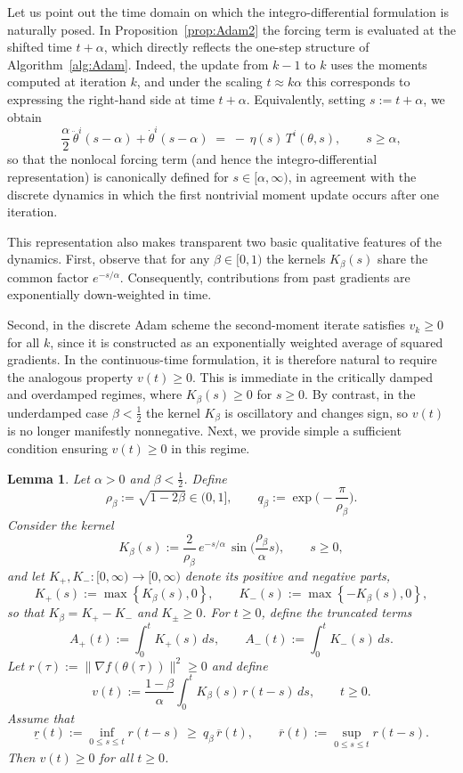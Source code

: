 \documentclass{article} %
\newtheorem{lemma}{Lemma}
\begin{document}
Let us point out the time domain on which the integro-differential formulation is naturally posed. In Proposition~\ref{prop:Adam2} the forcing term is evaluated at the shifted time $t+\alpha$, which directly reflects the one-step structure of Algorithm~\ref{alg:Adam}. Indeed, the update from $k-1$ to $k$ uses the moments computed at iteration $k$, and under the scaling $t\approx k\alpha$ this corresponds to expressing the right-hand side at time $t+\alpha$. Equivalently, setting $s:=t+\alpha$, we obtain
\[
\frac{\alpha}{2}\,\ddot\theta^i(s-\alpha)+\dot\theta^i(s-\alpha)\;=\;-\,\eta(s)\,T^i(\theta,s),
\qquad s\ge \alpha,
\]
so that the nonlocal forcing term (and hence the integro-differential representation) is canonically defined for $s\in[\alpha,\infty)$, in agreement with the discrete dynamics in which the first nontrivial moment update occurs after one iteration.

This representation also makes transparent two basic qualitative features of the dynamics. First, observe that for any $\beta\in[0,1)$ the kernels $K_\beta(s)$ share the common factor $e^{-s/\alpha}$. Consequently, contributions from past gradients are exponentially down-weighted in time.

Second, in the discrete Adam scheme the second-moment iterate satisfies $v_k\ge 0$ for all $k$, since it is constructed as an exponentially weighted average of squared gradients. In the continuous-time formulation, it is therefore natural to require the analogous property $v(t)\ge 0$. This is immediate in the critically damped and overdamped regimes, where $K_\beta(s)\ge 0$ for $s\ge 0$. By contrast, in the underdamped case $\beta<\tfrac12$ the kernel $K_\beta$ is oscillatory and changes sign, so $v(t)$ is no longer manifestly nonnegative. Next, we provide simple a sufficient condition ensuring $v(t)\ge 0$ in this regime.

\begin{lemma}\label{lemma:vp}
Let $\alpha>0$ and $\beta<\tfrac12$. Define
\[
\rho_\beta:=\sqrt{1-2\beta}\in(0,1],\qquad 
q_\beta:=\exp\!\Big(-\frac{\pi}{\rho_\beta}\Big).
\]
Consider the kernel
\[
K_\beta(s):=\frac{2}{\rho_\beta}\,e^{-s/\alpha}\,\sin\!\Big(\frac{\rho_\beta}{\alpha}s\Big),\qquad s\ge 0,
\]
and let $K_+,K_-:[0,\infty)\to[0,\infty)$ denote its positive and negative parts,
\[
K_+(s):=\max\left\{K_\beta(s),0\right\},\qquad 
K_-(s):=\max\left\{-K_\beta(s),0\right\},
\]
so that $K_\beta=K_+-K_-$ and $K_\pm\ge 0$. For $t\ge 0$, define the truncated terms
\[
A_+(t):=\int_0^t K_+(s)\,ds,\qquad 
A_-(t):=\int_0^t K_-(s)\,ds.
\]
Let $r(\tau):=\|\nabla f(\theta(\tau))\|^2\ge 0$ and define
\[
v(t):=\frac{1-\beta}{\alpha}\int_0^t K_\beta(s)\,r(t-s)\,ds,\qquad t\ge 0.
\]
Assume that
\[
\underline r(t):=\inf_{0\le s\le t} r(t-s)\ \ge\ q_\beta\,\overline r(t),
\qquad 
\overline r(t):=\sup_{0\le s\le t} r(t-s).
\]
Then $v(t)\ge 0$ for all $t\ge 0$.
\end{lemma}
\end{document}
